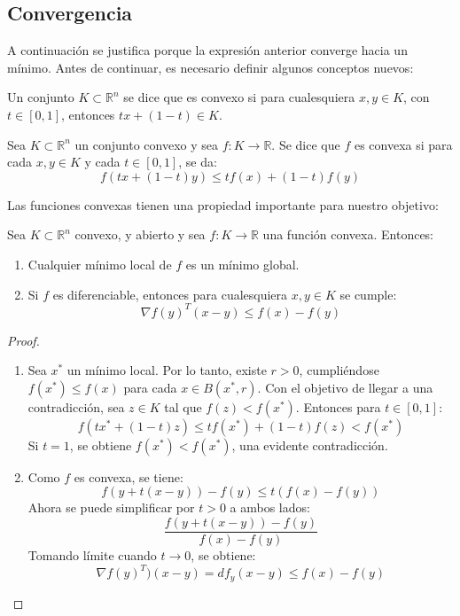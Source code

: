 \subsection*{Convergencia}

A continuación se justifica porque la expresión anterior converge hacia un mínimo. Antes de continuar, es necesario definir algunos
conceptos nuevos:
\begin{definition}
    Un conjunto $K\subset \mathbb{R}^n$ se dice que es convexo si para cualesquiera $x,y\in K$, con $t\in[0,1]$, entonces $tx+(1-t)\in K$.
\end{definition}

\begin{definition}
    Sea $K\subset \mathbb{R}^n$ un conjunto convexo y sea $f: K \rightarrow \mathbb{R}$. Se dice que $f$ es convexa si para cada $x,y\in K$ y cada $t \in [0,1]$, se da:
    \[
        f(tx+(1-t)y) \leq tf(x)+(1-t)f(y)
    \]
\end{definition}

Las funciones convexas tienen una propiedad importante para nuestro objetivo:

\begin{proposition}\label{prop:convexo}
    Sea $K\subset \mathbb{R}^n$ convexo, y abierto y sea $f: K \rightarrow \mathbb{R}$ una función convexa. Entonces:
    \begin{enumerate}
        \item Cualquier mínimo local de $f$ es un mínimo global.
        \item Si $f$ es diferenciable, entonces para cualesquiera $x,y\in K$ se cumple:
        \begin{equation}\label{random:2}
            \nabla f(y)^T(x-y) \leq f(x) - f(y)
        \end{equation}
    \end{enumerate}
\end{proposition}

\begin{proof}$ $
    \begin{enumerate}
        \item Sea $x^*$ un mínimo local. Por lo tanto, existe $r>0$, cumpliéndose $f(x^*)\leq f(x)$ para cada $x\in B(x^*, r)$. Con el objetivo
        de llegar a una contradicción, sea $z\in K$ tal que $f(z) < f(x^*)$. Entonces para $t\in[0,1]$:
        \[
            f(tx^* + (1-t)z) \leq tf(x^*)+(1-t)f(z) < f(x^*)
        \]
        Si $t=1$, se obtiene $f(x^*) < f(x^*)$, una evidente contradicción.
        \item Como $f$ es convexa, se tiene:
        \[
            f(y+t(x-y))-f(y) \leq t(f(x)-f(y))
        \]
        Ahora se puede simplificar por $t>0$ a ambos lados:
        \[
            \frac{f(y+t(x-y))-f(y)}{f(x)-f(y)}
        \]
        Tomando límite cuando $t \longrightarrow 0$, se obtiene:
        \[
            \nabla f(y)^T)(x-y)=df_y(x-y) \leq f(x)-f(y)
        \]
    \end{enumerate}
\end{proof}

